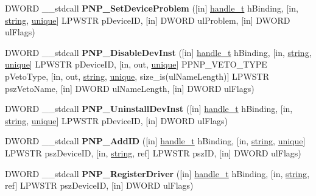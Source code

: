 \begin{DoxyCompactItemize}
\item 
\mbox{\label{interfacepnp_ae566ba29cc84c3ba3ba89363dcf945e1}} 
D\+W\+O\+RD \+\_\+\+\_\+stdcall {\bfseries P\+N\+P\+\_\+\+Set\+Device\+Problem} (\mbox{[}in\mbox{]} \hyperlink{interfacevoid}{handle\+\_\+t} h\+Binding, \mbox{[}in, \hyperlink{structstring}{string}, \hyperlink{interfaceunique}{unique}\mbox{]} L\+P\+W\+S\+TR p\+Device\+ID, \mbox{[}in\mbox{]} D\+W\+O\+RD ul\+Problem, \mbox{[}in\mbox{]} D\+W\+O\+RD ul\+Flags)
\item 
\mbox{\label{interfacepnp_aedd617a9ec61a9d615ceb6b0c37cd790}} 
D\+W\+O\+RD \+\_\+\+\_\+stdcall {\bfseries P\+N\+P\+\_\+\+Disable\+Dev\+Inst} (\mbox{[}in\mbox{]} \hyperlink{interfacevoid}{handle\+\_\+t} h\+Binding, \mbox{[}in, \hyperlink{structstring}{string}, \hyperlink{interfaceunique}{unique}\mbox{]} L\+P\+W\+S\+TR p\+Device\+ID, \mbox{[}in, out, \hyperlink{interfaceunique}{unique}\mbox{]} P\+P\+N\+P\+\_\+\+V\+E\+T\+O\+\_\+\+T\+Y\+PE p\+Veto\+Type, \mbox{[}in, out, \hyperlink{structstring}{string}, \hyperlink{interfaceunique}{unique}, size\+\_\+is(ul\+Name\+Length)\mbox{]} L\+P\+W\+S\+TR psz\+Veto\+Name, \mbox{[}in\mbox{]} D\+W\+O\+RD ul\+Name\+Length, \mbox{[}in\mbox{]} D\+W\+O\+RD ul\+Flags)
\item 
\mbox{\label{interfacepnp_a896c82a096427d4d0d51742085c13b64}} 
D\+W\+O\+RD \+\_\+\+\_\+stdcall {\bfseries P\+N\+P\+\_\+\+Uninstall\+Dev\+Inst} (\mbox{[}in\mbox{]} \hyperlink{interfacevoid}{handle\+\_\+t} h\+Binding, \mbox{[}in, \hyperlink{structstring}{string}, \hyperlink{interfaceunique}{unique}\mbox{]} L\+P\+W\+S\+TR p\+Device\+ID, \mbox{[}in\mbox{]} D\+W\+O\+RD ul\+Flags)
\item 
\mbox{\label{interfacepnp_ab973d934aa2aca6934195368df426d4b}} 
D\+W\+O\+RD \+\_\+\+\_\+stdcall {\bfseries P\+N\+P\+\_\+\+Add\+ID} (\mbox{[}in\mbox{]} \hyperlink{interfacevoid}{handle\+\_\+t} h\+Binding, \mbox{[}in, \hyperlink{structstring}{string}, \hyperlink{interfaceunique}{unique}\mbox{]} L\+P\+W\+S\+TR psz\+Device\+ID, \mbox{[}in, \hyperlink{structstring}{string}, ref\mbox{]} L\+P\+W\+S\+TR psz\+ID, \mbox{[}in\mbox{]} D\+W\+O\+RD ul\+Flags)
\item 
\mbox{\label{interfacepnp_ac2d37d3c076dca2102b36fee1508fb5d}} 
D\+W\+O\+RD \+\_\+\+\_\+stdcall {\bfseries P\+N\+P\+\_\+\+Register\+Driver} (\mbox{[}in\mbox{]} \hyperlink{interfacevoid}{handle\+\_\+t} h\+Binding, \mbox{[}in, \hyperlink{structstring}{string}, ref\mbox{]} L\+P\+W\+S\+TR psz\+Device\+ID, \mbox{[}in\mbox{]} D\+W\+O\+RD ul\+Flags)

\end{DoxyCompactItemize}
